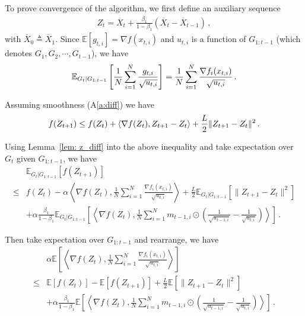 \documentclass[11pt]{article}
\begin{document}
To prove convergence of the algorithm, we first define an auxiliary sequence 
\begin{align}\label{eq: seq_z}
Z_{t} = \overline X_t + \frac{\beta_1}{1-\beta_1} (\overline X_t - \overline X_{t-1}) \, ,
\end{align}
with $\overline X_{0} \triangleq \overline X_1$.
Since $\mathbb E[g_{t,i}] = \nabla f(x_{t,i})$ and $u_{t,i}$ is a function of $G_{1:t-1}$ (which denotes $G_1,G_2,\cdots,G_{t-1}$), we have 
\begin{align}\notag
\mathbb E_{G_t|G_{1:t-1}} \left[\frac{1}{N} \sum_{i=1}^N \frac{g_{t,i}}{\sqrt{u_{t,i}}}\right] =\frac{1}{N} \sum_{i=1}^N \frac{\nabla f_i(x_{t,i})}{\sqrt{u_{t,i}}} \, .
\end{align}

Assuming smoothness (A\ref{a:diff}) we have 
\begin{align}\notag
f( Z_{t+1}) \leq f( Z_{t}) + \langle \nabla f( Z_{t}),  Z_{t+1}-  Z_{t} \rangle + \frac{L}{2}\| Z_{t+1}-  Z_{t}\|^2 \, .
\end{align}

Using Lemma~\ref{lem: z_diff} into the above inequality and take expectation over $G_{t}$ given $G_{1:t-1}$, we have 
\begin{align}
&\mathbb E_{G_t|G_{1:t-1}} [f( Z_{t+1})] \nonumber \\
\leq & f( Z_{t})  - \alpha  \left \langle \nabla f( Z_{t}), \frac{1}{N} \sum_{i=1}^N \frac{\nabla f_i(x_{t,i})}{\sqrt{u_{t,i}}}  \right \rangle + \frac{L}{2} \mathbb E_{G_t|G_{1:t-1}}\left[\| Z_{t+1}-  Z_{t}\|^2 \right]  \nonumber \\
&+ \alpha \frac{\beta_1}{1-\beta_1}  \mathbb E_{G_t|G_{1:t-1}} \left [\left \langle \nabla f( Z_{t}) , \frac{1}{N} \sum_{i=1}^N m_{t-1	,i} \odot (\frac{1}{\sqrt{u_{t-1,i}}} - \frac{1}{\sqrt{u_{t,i}}}) \right \rangle \right] \, . \nonumber
\end{align}

Then take expectation over $G_{1:t-1}$ and rearrange, we have 
\begin{align}\label{eq: exp_lip}
& \alpha  \mathbb E\left[\left \langle \nabla f( Z_{t}), \frac{1}{N} \sum_{i=1}^N \frac{\nabla f_i(x_{t,i})}{\sqrt{u_{t,i}}}  \right \rangle \right] \nonumber \\
\leq & \mathbb E  [f( Z_{t})]  -  \mathbb E [f( Z_{t+1})] + \frac{L}{2} \mathbb E\left[\| Z_{t+1}-  Z_{t}\|^2 \right] \nonumber  \\
&+ \alpha \frac{\beta_1}{1-\beta_1}  \mathbb E \left [\left \langle \nabla f( Z_{t}) , \frac{1}{N} \sum_{i=1}^N m_{t-1	,i} \odot (\frac{1}{\sqrt{u_{t-1,i}}} - \frac{1}{\sqrt{u_{t,i}}}) \right \rangle \right] \, .
\end{align}
\end{document}
